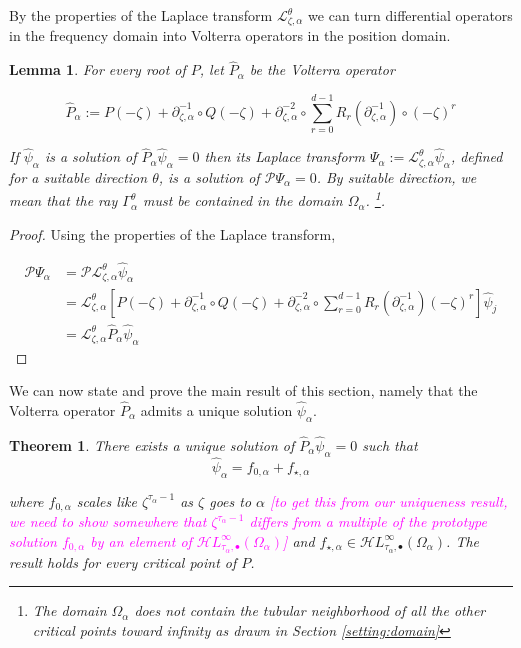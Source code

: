 \documentclass{article}
\theoremstyle{plain}
\newtheorem{lemma}{Lemma}
\newtheorem{thm}{Theorem}
\newcommand{\laplace}{\mathcal{L}}
\newcommand{\fracderiv}[3]{\partial^{#1}_{#2, #3}}
\newcommand{\singexp}[2]{\mathcal{H}L^\infty_{#1, #2}}
\newcommand{\singexpalg}[1]{\singexp{#1}{\bullet}}
\begin{document}
By the properties of the Laplace transform $\laplace_{\zeta,\alpha}^{\theta}$ we can turn differential operators in the frequency domain into Volterra operators in the position domain. 

\begin{lemma}
 For every root of $P$, let $\hat{P}_{\alpha}$ be the Volterra operator 
 
\begin{equation}\label{P-hat_j}
\hat{P}_\alpha:=P(-\zeta)+\partial_{\zeta,\alpha}^{-1}\circ Q(-\zeta)+\partial_{\zeta,\alpha}^{-2}\circ\sum_{r=0}^{d-1}R_r(\partial_{\zeta,\alpha}^{-1})\circ (-\zeta)^r
\end{equation}
 
If $\hat{\psi}_\alpha$ is a solution of $\hat{P}_\alpha\hat{\psi}_\alpha=0$ then its Laplace transform $\Psi_\alpha:=\laplace_{\zeta,\alpha}^{\theta}\hat{\psi}_\alpha$, defined for a suitable direction $\theta$, is a solution of $\mathcal{P}\Psi_\alpha=0$. By suitable direction, we mean that the ray $\Gamma_{\alpha}^\theta$ must be contained in the domain $\Omega_{\alpha}$. \footnote{The domain $\Omega_{\alpha}$ does not contain the tubular neighborhood of all the other critical points toward infinity as drawn in Section \ref{setting:domain}}.      
\end{lemma}

\begin{proof}
Using the properties of the Laplace transform, 

    \begin{align*}
        \mathcal{P}\Psi_\alpha&=\mathcal{P}\laplace_{\zeta,\alpha}^{\theta}\hat{\psi}_\alpha\\
        &=\laplace_{\zeta,\alpha}^{\theta}\left[P(-\zeta)+\fracderiv{-1}{\zeta}{\alpha}\circ Q(-\zeta)+\fracderiv{-2}{\zeta}{\alpha}\circ\sum_{r=0}^{d-1}R_r(\fracderiv{-1}{\zeta}{\alpha})(-\zeta)^r\right]\hat{\psi}_j\\
        &=\laplace_{\zeta,\alpha}^{\theta}\hat{P}_\alpha\hat{\psi}_\alpha
    \end{align*}
\end{proof}

We can now state and prove the main result of this section, namely that the Volterra operator $\hat{P}_\alpha$ admits a unique solution $\hat{\psi}_\alpha$. %

\begin{thm}\label{thm:example}
    There exists a unique solution of $\hat{P}_\alpha\hat{\psi}_\alpha=0$ such that 
    \[\hat{\psi}_\alpha = f_{0,\alpha}+ f_{\star,\alpha}\]

    where $f_{0,\alpha}$ scales like $\zeta^{\tau_\alpha-1}$ as $\zeta$ goes to $\alpha$ \textcolor{magenta}{[to get this from our uniqueness result, we need to show somewhere that $\zeta^{\tau_\alpha - 1}$ differs from a multiple of the prototype solution $f_{0,\alpha}$ by an element of $\singexpalg{\tau_\alpha}(\Omega_\alpha)$]} and $f_{\star,\alpha}\in\singexpalg{\tau_\alpha}(\Omega_\alpha)$. The result holds for every critical point of $P$. 
\end{thm}
\end{document}
